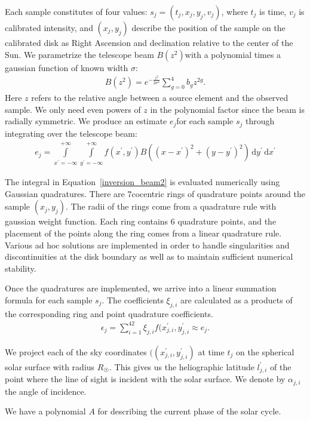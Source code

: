 \documentclass{aa}
\newcommand{\eqnl}[2]{\begin{eqnarray}\label{#1}#2\end{eqnarray}}
\newcommand{\intef}[4]{\int \limits_{#1 = #2}^{#3} \! #4 \, \mathrm{d} #1}
\begin{document}
  Each sample constitutes of four values: $s_j = (t_j, x_j, y_j, v_j)$, where $t_j$ is time, $v_j$ is calibrated intensity, 
  and $(x_j,y_j)$ describe the position of the sample on the calibrated disk as Right Ascension and declination 
  relative to the center of the Sun. We parametrize the telescope beam $B(z^2)$with a polynomial times a gaussian function of known width $\sigma$:
  \eqnl{inversion_beam}{
  B(z^2) = e^{-\frac{z^2}{2 \sigma^2}} \sum \limits_{g=0}^{4} b_g z^{2g} \text{.}
  }
  Here $z$ refers to the relative angle between a source element and the observed sample. We only need even powers of $z$ in the polynomial factor since the beam is radially symmetric. We produce an estimate $e_j$for each sample $s_j$ through integrating over the telescope beam:
  \eqnl{inversion_beam2}{
  e_j = \intef{x^{\prime}}{-\infty}{+\infty}{ \intef{y^{\prime}}{-\infty}{+\infty}{ f(x^{\prime}, y^{\prime}) B \left( \left( x - x^{\prime} \right)^2 + \left( y - y^{\prime} \right)^2 \right)}}
  }

  The integral in Equation~\ref{inversion_beam2} is evaluated numerically using Gaussian quadratures. There are 
  $7$cocentric rings of quadrature points around the sample $(x_j,y_j)$. The radii of the rings come from a quadrature 
  rule with gaussian weight function. Each ring contains $6$ quadrature points, and the placement of the points along the ring comes from a linear 
  quadrature rule. Various ad hoc solutions are implemented in order to handle singularities and discontinuities at the 
  disk boundary as well as to maintain sufficient numerical stability.

  Once the quadratures are implemented, we arrive into a linear summation formula for each sample $s_j$. The coefficients $\xi_{j,i}$ are calculated as a products of the corresponding ring and point quadrature coefficients.
  \eqnl{inversion_beam3}{
  \epsilon_j = \sum \limits_{i=1}^{42} \xi_{j,i} f(x^{\prime}_{j,i}, y^{\prime}_{j,i} \approx e_j \text{.}
  }

   We project each of the sky coordinates $((x^{\prime}_{j,i}, y^{\prime}_{j,i})$ at time $t_j$ on the spherical solar 
   surface with radius $R_{\astrosun}$. This gives us the heliographic latitude $l^{\prime}_{j,i}$ of the point where the line of sight is incident with the solar surface. We denote by $\alpha_{j,i}$ the angle of incidence.
   
  We have a polynomial $A$ for describing the current phase of the solar 
   cycle.
   
  
\end{document}
